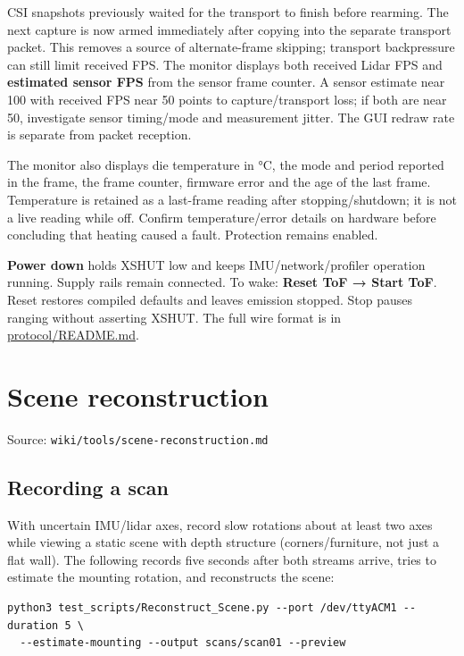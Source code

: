 \documentclass[10pt,a4paper,oneside]{report}
\begin{document}
CSI snapshots previously waited for the transport to finish before rearming. The next capture is now armed immediately after copying into the separate transport packet. This removes a source of alternate-frame skipping; transport backpressure can still limit received FPS. The monitor displays both received Lidar FPS and \textbf{estimated sensor FPS} from the sensor frame counter. A sensor estimate near 100 with received FPS near 50 points to capture/transport loss; if both are near 50, investigate sensor timing/mode and measurement jitter. The GUI redraw rate is separate from packet reception.

The monitor also displays die temperature in °C, the mode and period reported in the frame, the frame counter, firmware error and the age of the last frame. Temperature is retained as a last-frame reading after stopping/shutdown; it is not a live reading while off. Confirm temperature/error details on hardware before concluding that heating caused a fault. Protection remains enabled.

\textbf{Power down} holds XSHUT low and keeps IMU/network/profiler operation running. Supply rails remain connected. To wake: \textbf{Reset ToF → Start ToF}. Reset restores compiled defaults and leaves emission stopped. Stop pauses ranging without asserting XSHUT. The full wire format is in \hyperref[wiki-protocols-wire-protocol--magnecko-sense-wire-protocol]{protocol/README.md}.

\chapter{Scene reconstruction}\label{wiki-tools-scene-reconstruction--scene-reconstruction}

{\small\color{MGSMuted}Source: \nolinkurl{wiki/tools/scene-reconstruction.md}\par}\medskip

\section{Recording a scan}\label{wiki-tools-scene-reconstruction--recording-a-scan}

With uncertain IMU/lidar axes, record slow rotations about at least two axes while viewing a static scene with depth structure (corners/furniture, not just a flat wall). The following records five seconds after both streams arrive, tries to estimate the mounting rotation, and reconstructs the scene:

\begin{verbatim}
python3 test_scripts/Reconstruct_Scene.py --port /dev/ttyACM1 --duration 5 \
  --estimate-mounting --output scans/scan01 --preview
\end{verbatim}
\end{document}
